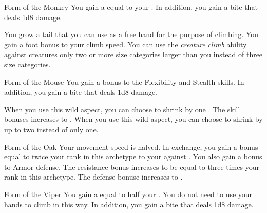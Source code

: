 {            %
            \begin{freeability}{Form of the Monkey}
                You gain a  equal to your .
                In addition, you gain a bite  that deals 1d8 damage.

                \rankline
                 You grow a tail that you can use as a free hand for the purpose of climbing.
                 You gain a  foot bonus to your climb speed.
                 You can use the \textit{creature climb} ability against creatures only two or more size categories larger than you instead of three size categories.
            \end{freeability}

            \begin{freeability}{Form of the Mouse}
                You gain a  bonus to the Flexibility and Stealth skills.
                In addition, you gain a bite  that deals 1d8 damage.
                
                \rankline
                 When you use this wild aspect, you can choose to shrink by one .
                 The skill bonuses increases to .
                 When you use this wild aspect, you can choose to shrink by up to two  instead of only one.
            \end{freeability}

            \begin{freeability}{Form of the Oak}
                Your movement speed is halved.
                In exchange, you gain a bonus equal to twice your rank in this archetype to your  against .
                \rankline
                 You also gain a  bonus to Armor defense.
                 The resistance bonus increases to be equal to three times your rank in this archetype.
                 The defense bonuse increases to .
            \end{freeability}

            \begin{freeability}{Form of the Viper}
                You gain a  equal to half your .
                You do not need to use your hands to climb in this way.
                In addition, you gain a bite  that deals 1d8 damage.


\end{freeability}}
